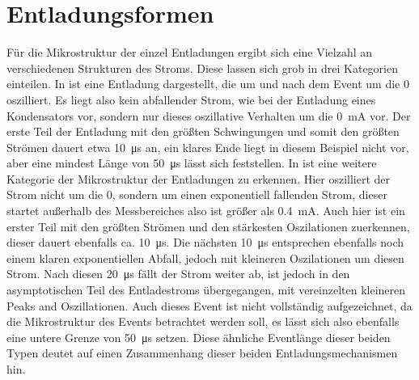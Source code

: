 \section{Entladungsformen}
Für die Mikrostruktur der einzel Entladungen ergibt sich eine Vielzahl an verschiedenen Strukturen des Stroms. Diese lassen sich grob in drei Kategorien einteilen. In  ist eine Entladung dargestellt, die um und nach dem Event um die 0 oszilliert. Es liegt also kein abfallender Strom, wie bei der Entladung eines Kondensators vor, sondern nur dieses oszillative Verhalten um die \SI{0}{\milli\ampere} vor. Der erste Teil der Entladung mit den größten Schwingungen und somit den größten Strömen dauert etwa \SI{10}{\micro\second} an, ein klares Ende liegt in diesem Beispiel nicht vor, aber eine mindest Länge von \SI{50}{\micro\second} lässt sich feststellen.
In  ist eine weitere Kategorie der Mikrostruktur der Entladungen zu erkennen. Hier oszilliert der Strom nicht um die 0, sondern um einen exponentiell fallenden Strom, dieser startet außerhalb des Messbereiches also ist größer als \SI{0,4}{\milli\ampere}. Auch hier ist ein erster Teil mit den größten Strömen und den stärkesten Oszilationen zuerkennen, dieser dauert ebenfalls ca. \SI{10}{\micro\second}. Die nächsten \SI{10}{\micro\second} entsprechen ebenfalls noch einem klaren exponentiellen Abfall, jedoch mit kleineren Oszilationen um diesen Strom. Nach diesen \SI{20}{\micro\second} fällt der Strom weiter ab, ist jedoch in den asymptotischen Teil des Entladestroms übergegangen, mit vereinzelten kleineren Peaks and Oszillationen. Auch dieses Event ist nicht vollständig aufgezeichnet, da die Mikrostruktur des Events betrachtet werden soll, es lässt sich also ebenfalls eine untere Grenze von \SI{50}{\micro\second} setzen. Diese ähnliche Eventlänge dieser beiden Typen deutet auf einen Zusammenhang dieser beiden Entladungsmechanismen hin.
